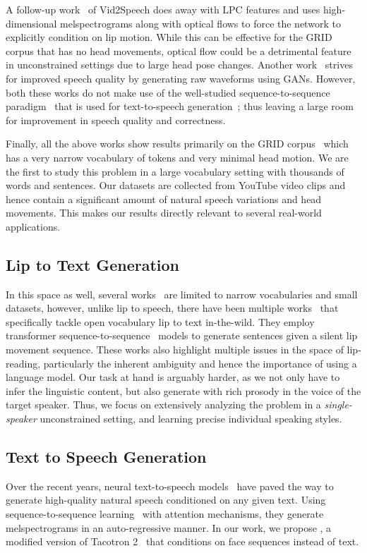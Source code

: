 \documentclass[10pt,twocolumn,letterpaper]{article}
\begin{document}
A follow-up work~\cite{Ephrat2017ImprovedSR} of Vid2Speech does away with LPC features and uses high-dimensional melspectrograms along with optical flows to force the network to explicitly condition on lip motion. While this can be effective for the GRID corpus that has no head movements, optical flow could be a detrimental feature in unconstrained settings due to large head pose changes. Another work~\cite{vougioukas2019video} strives for improved speech quality by generating raw waveforms using GANs. However, both these works do not make use of the well-studied sequence-to-sequence paradigm~\cite{sutskever2014sequence} that is used for text-to-speech generation~\cite{shen2018natural}; thus leaving a large room for improvement in speech quality and correctness. 

Finally, all the above works show results primarily on the GRID corpus~\cite{cooke2006audio} which has a very narrow vocabulary of  tokens and very minimal head motion. We are the first to study this problem in a large vocabulary setting with thousands of words and sentences. Our datasets are collected from YouTube video clips and hence contain a significant amount of natural speech variations and head movements. This makes our results directly relevant to several real-world applications.

\subsection{Lip to Text Generation}
In this space as well, several works~\cite{chung2016lip,xu2018lcanet,wand2016lipreading,qu2019lipsound} are limited to narrow vocabularies and small datasets, however, unlike lip to speech, there have been multiple works~\cite{chung2017lip,Afouras2018DeepLR} that specifically tackle open vocabulary lip to text in-the-wild. They employ transformer sequence-to-sequence~\cite{vaswani2017attention} models to generate sentences given a silent lip movement sequence. These works also highlight multiple issues in the space of lip-reading, particularly the inherent ambiguity and hence the importance of using a language model. Our task at hand is arguably harder, as we not only have to infer the linguistic content, but also generate with rich prosody in the voice of the target speaker. Thus, we focus on extensively analyzing the problem in a \textit{single-speaker} unconstrained setting, and learning precise individual speaking styles. 

\subsection{Text to Speech Generation}
Over the recent years, neural text-to-speech models~\cite{shen2018natural,ping2017deep} have paved the way to generate high-quality natural speech conditioned on any given text. Using sequence-to-sequence learning~\cite{sutskever2014sequence} with attention mechanisms, they generate melspectrograms in an auto-regressive manner. In our work, we propose \modelnamewithoutspace, a modified version of Tacotron 2~\cite{shen2018natural} that conditions on face sequences instead of text.
\end{document}

